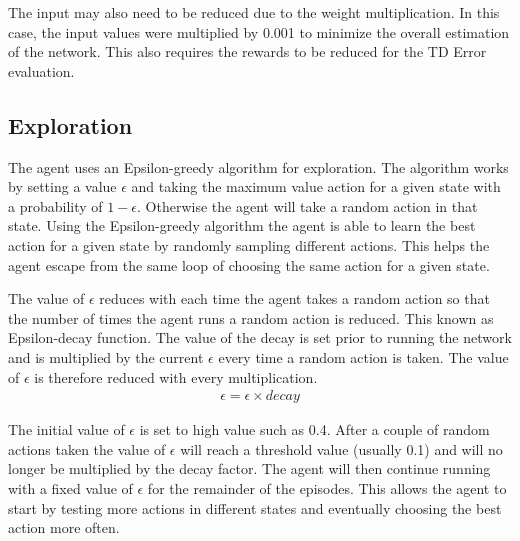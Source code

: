 The input may also need to be reduced due to the weight multiplication. In this case, the input values were multiplied by 0.001 to minimize the overall estimation of the network. This also requires the rewards to be reduced for the TD Error evaluation.

\subsection{Exploration}
The agent uses an Epsilon-greedy algorithm for exploration. The algorithm works by setting a value $\epsilon$ and taking the maximum value action for a given state with a probability of $1-\epsilon$. Otherwise the agent will take a random action in that state. Using the Epsilon-greedy algorithm the agent is able to learn the best action for a given state by randomly sampling different actions. This helps the agent escape from the same loop of choosing the same action for a given state. 

The value of $\epsilon$ reduces with each time the agent takes a random action so that the number of times the agent runs a random action is reduced. This known as Epsilon-decay function. The value of the decay is set prior to running the network and is multiplied by the current $\epsilon$ every time a random action is taken. The value of $\epsilon$ is therefore reduced with every multiplication.
\begin{align}
\epsilon = \epsilon \times decay
\end{align}

The initial value of $\epsilon$ is set to high value such as 0.4. After a couple of random actions taken the value of $\epsilon$ will reach a threshold value (usually 0.1) and will no longer be multiplied by the decay factor. The agent will then continue running with a fixed value of $\epsilon$ for the remainder of the episodes. This allows the agent to start by testing more actions in different states and eventually choosing the best action more often. 

